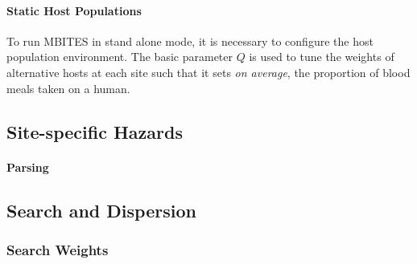 \documentclass{article}
\begin{document}
\paragraph{Static Host Populations}

To run MBITES in stand alone mode, it is necessary to configure the host population environment.  The basic parameter $Q$ is used to tune the weights of alternative hosts at each site such that it sets {\em on average}, the proportion of blood meals taken on a human.

\subsection{Site-specific Hazards}

\paragraph{Parsing}


\subsection{Search and Dispersion}

\subsubsection{Search Weights}
\end{document}
